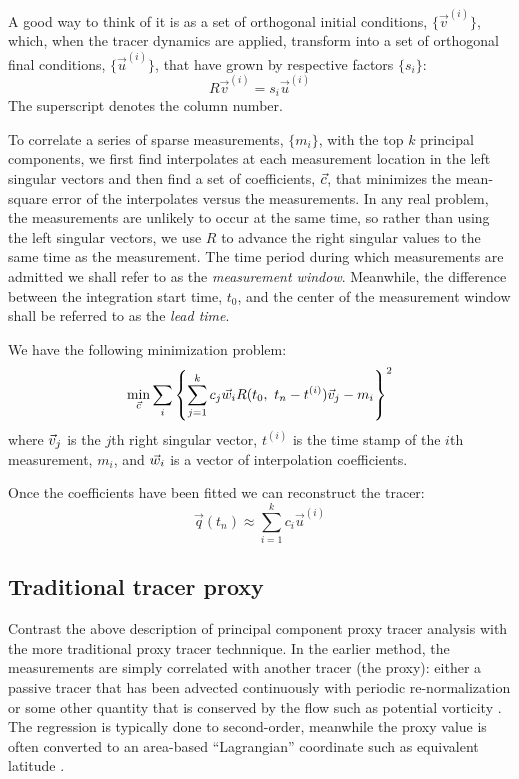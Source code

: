 \documentclass{article}
\begin{document}
A good way to think of it is as a set of orthogonal initial conditions,
$\lbrace \vec v^{(i)} \rbrace$, which, when the tracer dynamics are applied,
transform into a set of orthogonal final conditions, 
$\lbrace \vec u^{(i)} \rbrace$,
that have grown by respective factors $\lbrace s_i \rbrace$:
\begin{equation}
	R \vec v^{(i)} = s_i \vec u^{(i)}
\end{equation}
The superscript denotes the column number.

To correlate a series of sparse measurements, $\lbrace m_i \rbrace$,
with the top $k$ principal components, we first find interpolates at each
measurement location in the left singular vectors and then find a set
of coefficients, $\vec c$, that minimizes the mean-square error of the
interpolates versus the measurements.
In any real problem, the measurements are unlikely to occur at the same time,
so rather than using the left singular vectors, we use $R$ to advance the
right singular values to the same time as the measurement.
The time period during which measurements are admitted we shall refer to as
the {\it measurement window}.
Meanwhile, the difference between the integration start time, $t_0$,
and the center of the measurement window shall be referred to as the
{\it lead time}.

We have the following minimization problem:
\begin{equation}
	\min_{\vec c} \sum_i \left \lbrace \sum_{j=1}^k c_j \vec w_i R(t_0, ~ t_n-t^{(i)}) \vec v_j - m_i \right \rbrace^2
\end{equation}
where $\vec v_j$ is the $j$th right singular vector, $t^{(i)}$ is the time
stamp of the $i$th measurement, $m_i$, and $\vec w_i$ is a vector of 
interpolation coefficients.

Once the coefficients have been fitted we can reconstruct the tracer:
\begin{equation}
	\vec q(t_n) \approx \sum_{i=1}^k c_i \vec u^{(i)}
\end{equation}

\subsection{Traditional tracer proxy}

\label{traditional}

Contrast the above description of principal component proxy tracer
analysis with the more traditional proxy tracer technnique.
In the earlier method, the measurements are simply correlated with another
tracer (the proxy): either a passive tracer that has been advected
continuously with periodic re-normalization \citep{Allen_Nakamura2003} 
or some other quantity that is conserved by the flow 
such as potential vorticity \citep{Randall_etal2002,Hoskins_etal1985}.
The regression is typically done to second-order, meanwhile the proxy value
is often converted to an area-based ``Lagrangian'' coordinate such as
equivalent latitude \citep{Butchart_Remsberg1986}.
\end{document}
